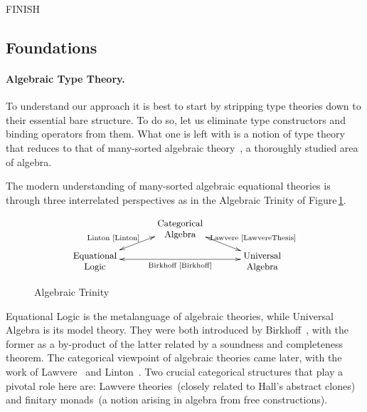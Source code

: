 \documentclass[11pt,twocolumn]{article}
\begin{document}
{\color{red}FINISH}

\subsection{Foundations}
\label{Foundations}

\setcounter{paragraph}{0}
\paragraph{Algebraic Type Theory.}
\label{AlgebraicTypeTheoryParagraph}

To understand our approach it is best to start by stripping type theories
down to their essential bare structure.  To do so, let us eliminate type
constructors and binding operators from them.  What one is left with is a
notion of type theory that reduces to that of many-sorted algebraic
theory~\cite{Birkhoff}, a thoroughly studied area of algebra.

The modern understanding of many-sorted algebraic equational theories is
through three interrelated perspectives as in the Algebraic Trinity 
of Figure\,\ref{AlgebraicTrinity}.
\begin{figure}[H]
  \caption{Algebraic Trinity}
  \vspace*{-2.5mm}
    \[\xymatrix@R=7.5pt@C=35pt{
      & \txt{\small Categorical\\ \small Algebra} 
      \ar@{<->}[dr]^(.55){\null\hspace*{5mm}\txt{\scriptsize Lawvere~\cite{LawvereThesis}}}
      \ar@{<->}[dl]_(.55){\null\hspace*{-10mm}\txt{\scriptsize Linton~\cite{Linton}}}
      & 
      \\
      \txt{\small Equational\\ \small Logic}
      \ar@{<->}[rr]_-{\txt{\scriptsize Birkhoff~\cite{Birkhoff}}}
      &
      & 
      \txt{\small Universal\\ \small Algebra} 
    }\]
  \vspace*{-2.5mm}
\label{AlgebraicTrinity}
\end{figure}
Equational Logic is the metalanguage of algebraic theories, while
Universal Algebra is its model theory.  They were both introduced by
Birkhoff~\cite{Birkhoff}, with the former as a by-product of the latter
related by a soundness and completeness theorem.  The categorical
viewpoint of algebraic theories came later, with the work of
Lawvere~\cite{LawvereThesis} and Linton~\cite{Linton}.  Two crucial
categorical structures that play a pivotal role here are: Lawvere
theories~(closely related to Hall's abstract clones) and finitary
monads~(a notion 
arising in algebra from free constructions).
\end{document}
